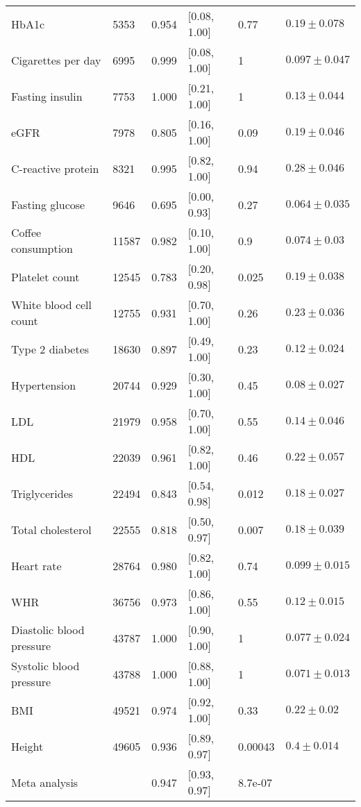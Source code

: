 \begin{tabular}{llrlll}
                   HbA1c &  5353 & 0.954 &              [0.08, 1.00] &    0.77 &   $0.19 \pm 0.078$ \\
      Cigarettes per day &  6995 & 0.999 &              [0.08, 1.00] &       1 &  $0.097 \pm 0.047$ \\
         Fasting insulin &  7753 & 1.000 &              [0.21, 1.00] &       1 &   $0.13 \pm 0.044$ \\
                    eGFR &  7978 & 0.805 &              [0.16, 1.00] &    0.09 &   $0.19 \pm 0.046$ \\
      C-reactive protein &  8321 & 0.995 &              [0.82, 1.00] &    0.94 &   $0.28 \pm 0.046$ \\
         Fasting glucose &  9646 & 0.695 &              [0.00, 0.93] &    0.27 &  $0.064 \pm 0.035$ \\
      Coffee consumption & 11587 & 0.982 &              [0.10, 1.00] &     0.9 &   $0.074 \pm 0.03$ \\
          Platelet count & 12545 & 0.783 &              [0.20, 0.98] &   0.025 &   $0.19 \pm 0.038$ \\
  White blood cell count & 12755 & 0.931 &              [0.70, 1.00] &    0.26 &   $0.23 \pm 0.036$ \\
         Type 2 diabetes & 18630 & 0.897 &              [0.49, 1.00] &    0.23 &   $0.12 \pm 0.024$ \\
            Hypertension & 20744 & 0.929 &              [0.30, 1.00] &    0.45 &   $0.08 \pm 0.027$ \\
                     LDL & 21979 & 0.958 &              [0.70, 1.00] &    0.55 &   $0.14 \pm 0.046$ \\
                     HDL & 22039 & 0.961 &              [0.82, 1.00] &    0.46 &   $0.22 \pm 0.057$ \\
           Triglycerides & 22494 & 0.843 &              [0.54, 0.98] &   0.012 &   $0.18 \pm 0.027$ \\
       Total cholesterol & 22555 & 0.818 &              [0.50, 0.97] &   0.007 &   $0.18 \pm 0.039$ \\
              Heart rate & 28764 & 0.980 &              [0.82, 1.00] &    0.74 &  $0.099 \pm 0.015$ \\
                     WHR & 36756 & 0.973 &              [0.86, 1.00] &    0.55 &   $0.12 \pm 0.015$ \\
Diastolic blood pressure & 43787 & 1.000 &              [0.90, 1.00] &       1 &  $0.077 \pm 0.024$ \\
 Systolic blood pressure & 43788 & 1.000 &              [0.88, 1.00] &       1 &  $0.071 \pm 0.013$ \\
                     BMI & 49521 & 0.974 &              [0.92, 1.00] &    0.33 &    $0.22 \pm 0.02$ \\
                  Height & 49605 & 0.936 &              [0.89, 0.97] & 0.00043 &    $0.4 \pm 0.014$ \\\midrule
           Meta analysis &       & 0.947 &              [0.93, 0.97] & 8.7e-07 &                    \\
\bottomrule
\end{tabular}
